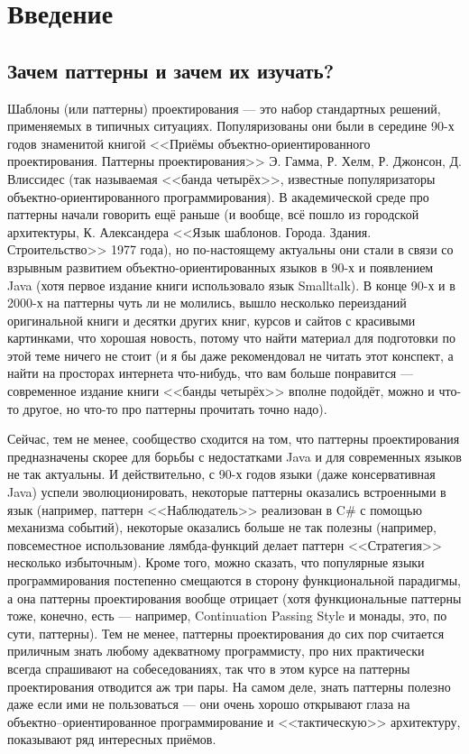 \documentclass{../../text-style}
\begin{document}
\maketitle
\thispagestyle{empty}

\section{Введение}

\subsection{Зачем паттерны и зачем их изучать?}

Шаблоны (или паттерны) проектирования --- это набор стандартных решений, применяемых в типичных ситуациях. Популяризованы они были в середине 90-х годов знаменитой книгой <<Приёмы объектно-ориентированного проектирования. Паттерны проектирования>> Э. Гамма, Р. Хелм, Р. Джонсон, Д. Влиссидес (так называемая <<банда четырёх>>, известные популяризаторы объектно-ориентированного программирования). В академической среде про паттерны начали говорить ещё раньше (и вообще, всё пошло из городской архитектуры, К. Александера <<Язык шаблонов. Города. Здания. Строительство>> 1977 года), но по-настоящему актуальны они стали в связи со взрывным развитием объектно-ориентированных языков в 90-х и появлением Java (хотя первое издание книги использовало язык Smalltalk). В конце 90-х и в 2000-х на паттерны чуть ли не молились, вышло несколько переизданий оригинальной книги и десятки других книг, курсов и сайтов с красивыми картинками, что хорошая новость, потому что найти материал для подготовки по этой теме ничего не стоит (и я бы даже рекомендовал не читать этот конспект, а найти на просторах интернета что-нибудь, что вам больше понравится --- современное издание книги <<банды четырёх>> вполне подойдёт, можно и что-то другое, но что-то про паттерны прочитать точно надо). 

Сейчас, тем не менее, сообщество сходится на том, что паттерны проектирования предназначены скорее для борьбы с недостатками Java и для современных языков не так актуальны. И действительно, с 90-х годов языки (даже консервативная Java) успели эволюционировать, некоторые паттерны оказались встроенными в язык (например, паттерн <<Наблюдатель>> реализован в C\# с помощью механизма событий), некоторые оказались больше не так полезны (например, повсеместное использование лямбда-функций делает паттерн <<Стратегия>> несколько избыточным). Кроме того, можно сказать, что популярные языки программирования постепенно смещаются в сторону функциональной парадигмы, а она паттерны проектирования вообще отрицает (хотя функциональные паттерны тоже, конечно, есть --- например, Continuation Passing Style и монады, это, по сути, паттерны). Тем не менее, паттерны проектирования до сих пор считается приличным знать любому адекватному программисту, про них практически всегда спрашивают на собеседованиях, так что в этом курсе на паттерны проектирования отводится аж три пары. На самом деле, знать паттерны полезно даже если ими не пользоваться --- они очень хорошо открывают глаза на объектно--ориентированное программирование и <<тактическую>> архитектуру, показывают ряд интересных приёмов.
\end{document}

